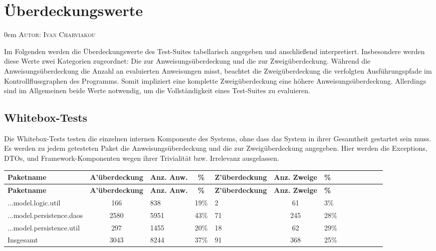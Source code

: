 \documentclass{article}
\makeatletter
\newcommand{\sectionauthor}[1]{
	{\parindent 0em \large \scshape Autor: #1 \par \nobreak \vspace*{1em}}
	\@afterheading
}
\makeatother
\begin{document}
\newpage

\section{Überdeckungswerte}
\sectionauthor{Ivan Charviakou}

Im Folgenden werden die Überdeckungswerte des Test-Suites tabellarisch angegeben und anschließend interpretiert. 
Insbesondere werden diese Werte zwei Kategorien zugeordnet: Die zur Anweisungsüberdeckung und die zur Zweigüberdeckung. 
Während die Anweisungsüberdeckung die Anzahl an evaluierten Anweisungen misst, beachtet die Zweigüberdeckung die verfolgten Ausführungspfade im Kontrollflussgraphen des Programms.
Somit impliziert eine komplette Zweigüberdeckung eine höhere Anweisungsüberdeckung. 
Allerdings sind im Allgemeinen beide Werte notwendig, um die Vollständigkeit eines Test-Suites zu evaluieren.

\subsection{Whitebox-Tests}

Die Whitebox-Tests testen die einzelnen internen Komponente des Systems, ohne dass das System in ihrer Gesamtheit gestartet sein muss. 
Es werden zu jedem getesteten Paket die Anweisungsüberdeckung und die zur Zweigüberdeckung angegeben. 
Hier werden die Exceptions, DTOs, und Framework-Komponenten wegen ihrer Trivialität bzw. Irrelevanz ausgelassen.

\begin{longtable}{@{}lclclclclclcl@{}}
\toprule
\textbf{Paketname} & \textbf{A'überdeckung} & \textbf{Anz. Anw.} & \textbf{\%} & \textbf{Z'überdeckung} & \textbf{Anz. Zweige} & \textbf{\%} \\* \midrule
\endfirsthead
\textbf{Paketname} & \textbf{A'überdeckung} & \textbf{Anz. Anw.} & \textbf{\%} & \textbf{Z'überdeckung} & \textbf{Anz. Zweige} & \textbf{\%} \\* \midrule
\endhead
...model.logic.util 			& 166 		& 838 		& 19\% 		& 2 			& 61 			& 3\% \\
...model.persistence.daos 		& 2580 		& 5951 		& 43\% 		& 71 			& 245 		& 28\% \\
...model.persistence.util 		& 297 		& 1455 		& 20\% 		& 18 			& 62 			& 29\% \\
Insgesamt 						& 3043 		& 8244 		& 37\% 		& 91 			& 368 		& 25\% \\* \bottomrule
\end{longtable}
\end{document}
